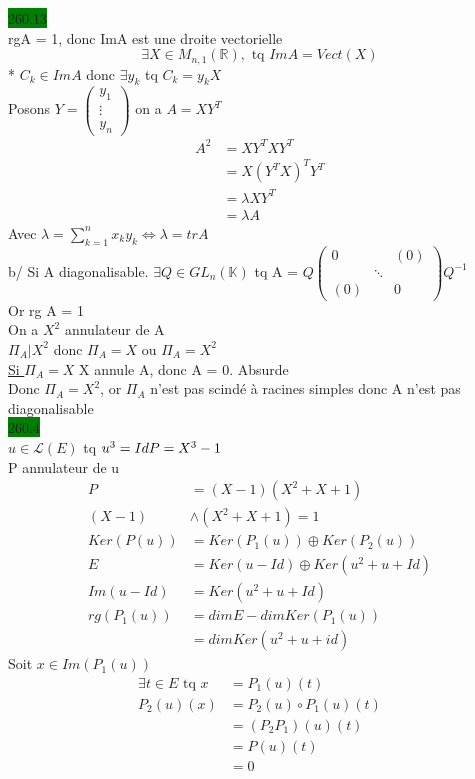 \documentclass{article}
\begin{document}
\noindent \colorbox{green}{260.13}\\
rgA = 1, donc ImA est une droite vectorielle \begin{equation*}
    \exists X \in M_{n,1}(\mathbb{R}), \text{ tq } ImA = Vect(X)
\end{equation*}
* \(C_k \in ImA\) donc \(\exists y_k\) tq  \(C_k = y_k X\)\\
Posons \(Y = \begin{pmatrix}
    y_1\\\vdots\\y_n
\end{pmatrix}\) on a \(A = XY^T\)
\begin{align*}
    A^2 &= XY^TXY^T\\
    &= X(Y^TX)^TY^T\\
    &= \lambda XY^T\\
    &= \lambda A
\end{align*}
Avec \(\lambda = \sum_{k=1}^{n}x_ky_k \Leftrightarrow \lambda = trA\)\\
b/ Si A diagonalisable. \(\exists Q \in GL_n(\mathbb{K})\) 
tq A = \(Q\begin{pmatrix}
    0 & & (0)\\
    & \ddots & \\
    (0) & & 0
\end{pmatrix}Q^{-1}\)\\
Or rg A = 1\\
On a \(X^2\) annulateur de A\\
\(\Pi_A | X^2\) donc \(\Pi_A = X\) ou \(\Pi_A = X^2\)\\
\underline{Si \(\Pi_A = X\)} X annule A, donc A  = 0. Absurde\\
Donc \(\Pi_A = X^2\), or \(\Pi_A\) n'est pas scindé à racines simples
donc A n'est pas diagonalisable\\

\noindent \colorbox{green}{260.4}\\
\(u \in \mathcal{L}(E)\) tq \(u^3 = Id\\
P = X^3 - 1\)\\
P annulateur de u \begin{align*}
    P &= (X-1)(X^2 + X + 1)\\
    (X-1)&\wedge(X^2 + X + 1) =1\\
    Ker(P(u)) &= Ker(P_1(u))\oplus Ker(P_2(u))\\
    E &= Ker(u-Id) \oplus Ker(u^2 + u + Id)\\
    Im(u-Id) &= Ker(u^2 + u + Id)\\
    rg(P_1(u)) &= dimE - dimKer(P_1(u))\\
    &= dimKer(u^2 + u + id)
\end{align*}
Soit \(x \in Im(P_1(u))\)\begin{align*}
    \exists t \in E \text{ tq } x &= P_1(u)(t)\\
    P_2(u)(x) &= P_2(u) \circ P_1(u)(t)\\
    &= (P_2P_1)(u)(t)\\
    &= P(u)(t)\\
    &= 0 
\end{align*}
\end{document}
